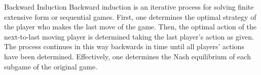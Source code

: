 Backward Induction
Backward induction is an iterative process for solving finite extensive form or sequential games. First, one determines the optimal strategy of the player who makes the last move of the game. Then, the optimal action of the next-to-last moving player is determined taking the last player's action as given. The process continues in this way backwards in time until all players' actions have been determined. Effectively, one determines the Nash equilibrium of each subgame of the original game.
